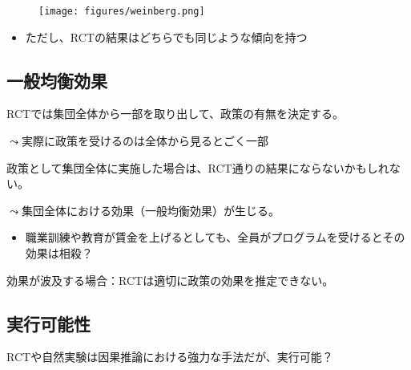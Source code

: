 \documentclass[
  xelatex,
  ja=standard]{bxjsarticle}
\providecommand{\tightlist}{%
  \setlength{\itemsep}{0pt}\setlength{\parskip}{0pt}}\usepackage{longtable,booktabs,array}
\begin{document}
\begin{figure}[htpb]

{\centering \texttt{[image: figures/weinberg.png]}

}

\caption{\citet{weinberg2014}}

\end{figure}

\begin{itemize}
\tightlist
\item
  ただし、RCTの結果はどちらでも同じような傾向を持つ\citep{weinberg2014}
\end{itemize}

\hypertarget{ux4e00ux822cux5747ux8861ux52b9ux679c}{%
\subsection{一般均衡効果}\label{ux4e00ux822cux5747ux8861ux52b9ux679c}}

RCTでは集団全体から一部を取り出して、政策の有無を決定する。

\(\leadsto\)実際に政策を受けるのは全体から見るとごく一部

政策として集団全体に実施した場合は、RCT通りの結果にならないかもしれない。

\(\leadsto\)集団全体における効果（一般均衡効果）が生じる。

\begin{itemize}
\tightlist
\item
  職業訓練や教育が賃金を上げるとしても、全員がプログラムを受けるとその効果は相殺？
\end{itemize}

効果が波及する場合：RCTは適切に政策の効果を推定できない。

\hypertarget{ux5b9fux884cux53efux80fdux6027}{%
\subsection{実行可能性}\label{ux5b9fux884cux53efux80fdux6027}}

RCTや自然実験は因果推論における強力な手法だが、実行可能？
\end{document}
